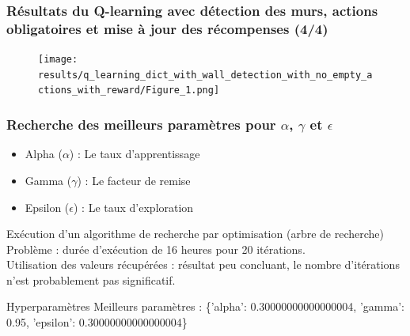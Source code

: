 \documentclass[
	11pt, %
]{beamer}
\begin{document}
\begin{frame}
    \frametitle{Résultats du Q-learning avec détection des murs, actions obligatoires et mise à jour des récompenses (4/4)}
    \begin{figure}
        \centering
        \texttt{[image: results/q\_learning\_dict\_with\_wall\_detection\_with\_no\_empty\_actions\_with\_reward/Figure\_1.png]}
    \end{figure}

\end{frame}

\begin{frame}
    \frametitle{Recherche des meilleurs paramètres pour $\alpha$, $\gamma$ et $\epsilon$}
    
    \begin{itemize}
        \item Alpha ($\alpha$) : Le taux d'apprentissage
        \item Gamma ($\gamma$) : Le facteur de remise
        \item Epsilon ($\epsilon$) : Le taux d'exploration 
    \end{itemize}
    
    \begin{block}{Exécution d'un algorithme de recherche par optimisation (arbre de recherche)}
        Problème : durée d'exécution de 16 heures pour 20 itérations. \\
        Utilisation des valeurs récupérées : résultat peu concluant, le nombre d'itérations n'est probablement pas significatif.
    \end{block}
    
    \begin{block}{Hyperparamètres}
        Meilleurs paramètres : \{'alpha': 0.30000000000000004, 'gamma': 0.95, 'epsilon': 0.30000000000000004\}
    \end{block}
\end{frame}
\end{document}
